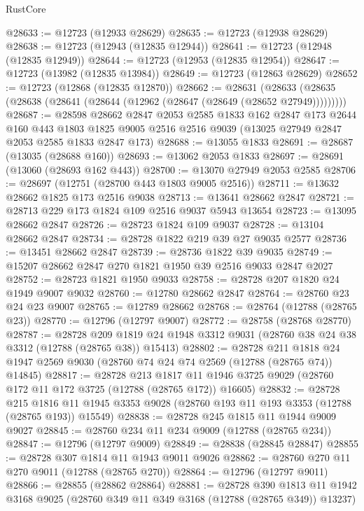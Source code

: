 \begin{lexlean}{RustCore}
\begin{coremodule}
@28633 := @12723 (@12933 @28629)
@28635 := @12723 (@12938 @28629)
@28638 := @12723 (@12943 (@12835 @12944))
@28641 := @12723 (@12948 (@12835 @12949))
@28644 := @12723 (@12953 (@12835 @12954))
@28647 := @12723 (@13982 (@12835 @13984))
@28649 := @12723 (@12863 @28629)
@28652 := @12723 (@12868 (@12835 @12870))
@28662 := @28631
    (@28633 (@28635 (@28638 (@28641 (@28644 (@12962 (@28647 (@28649 (@28652 @27949)))))))))
@28687 := @28598
    @28662
    @2847
    @2053
    @2585
    @1833
    @162
    @2847
    @173
    @2644
    @160
    @443
    @1803
    @1825
    @9005
    @2516
    @2516
    @9039
    (@13025 @27949 @2847 @2053 @2585 @1833 @2847 @173)
@28688 := @13055 @1833
@28691 := @28687 (@13035 (@28688 @160))
@28693 := @13062 @2053 @1833
@28697 := @28691 (@13060 (@28693 @162 @443))
@28700 := @13070 @27949 @2053 @2585
@28706 := @28697 (@12751 (@28700 @443 @1803 @9005 @2516))
@28711 := @13632 @28662 @1825 @173 @2516 @9038
@28713 := @13641 @28662 @2847
@28721 := @28713 @229 @173 @1824 @109 @2516 @9037 @5943 @13654
@28723 := @13095 @28662 @2847
@28726 := @28723 @1824 @109 @9037
@28728 := @13104 @28662 @2847
@28734 := @28728 @1822 @219 @39 @27 @9035 @2577
@28736 := @13451 @28662 @2847
@28739 := @28736 @1822 @39 @9035
@28749 := @15207 @28662 @2847 @270 @1821 @1950 @39 @2516 @9033 @2847 @2027
@28752 := @28723 @1821 @1950 @9033
@28758 := @28728 @207 @1820 @24 @1949 @9007 @9032
@28760 := @12780 @28662 @2847
@28764 := @28760 @23 @24 @23 @9007
@28765 := @12789 @28662
@28768 := @28764 (@12788 (@28765 @23))
@28770 := @12796 (@12797 @9007)
@28772 := @28758 (@28768 @28770)
@28787 := @28728
    @209
    @1819
    @24
    @1948
    @3312
    @9031
    (@28760 @38 @24 @38 @3312 (@12788 (@28765 @38)) @15413)
@28802 := @28728
    @211
    @1818
    @24
    @1947
    @2569
    @9030
    (@28760 @74 @24 @74 @2569 (@12788 (@28765 @74)) @14845)
@28817 := @28728
    @213
    @1817
    @11
    @1946
    @3725
    @9029
    (@28760 @172 @11 @172 @3725 (@12788 (@28765 @172)) @16605)
@28832 := @28728
    @215
    @1816
    @11
    @1945
    @3353
    @9028
    (@28760 @193 @11 @193 @3353 (@12788 (@28765 @193)) @15549)
@28838 := @28728 @245 @1815 @11 @1944 @9009 @9027
@28845 := @28760 @234 @11 @234 @9009 (@12788 (@28765 @234))
@28847 := @12796 (@12797 @9009)
@28849 := @28838 (@28845 @28847)
@28855 := @28728 @307 @1814 @11 @1943 @9011 @9026
@28862 := @28760 @270 @11 @270 @9011 (@12788 (@28765 @270))
@28864 := @12796 (@12797 @9011)
@28866 := @28855 (@28862 @28864)
@28881 := @28728
    @390
    @1813
    @11
    @1942
    @3168
    @9025
    (@28760 @349 @11 @349 @3168 (@12788 (@28765 @349)) @13237)

\end{coremodule}
\end{lexlean}
